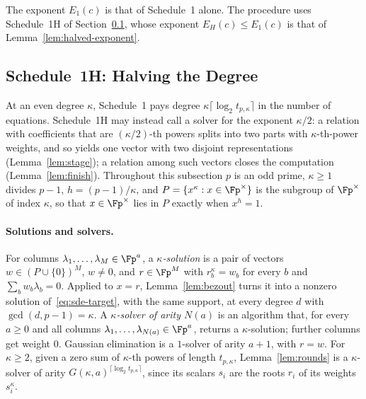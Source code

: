 
The exponent $E_1(c)$ is that of Schedule~1 alone. The procedure uses Schedule~1H of Section~\ref{sec:halving}, whose exponent $E_H(c) \le E_1(c)$ is that of Lemma~\ref{lem:halved-exponent}.

\subsection{Schedule~1H: Halving the Degree}
\label{sec:halving}

At an even degree $\kappa$, Schedule~1 pays degree $\kappa\lceil\log_2 t_{p,\kappa}\rceil$ in the number of equations. Schedule~1H may instead call a solver for the exponent $\kappa/2$: a relation with coefficients that are $(\kappa/2)$-th powers splits into two parts with $\kappa$-th-power weights, and so yields one vector with two disjoint representations (Lemma~\ref{lem:stage}); a relation among such vectors closes the computation (Lemma~\ref{lem:finish}). Throughout this subsection $p$ is an odd prime, $\kappa \ge 1$ divides $p-1$, $h = (p-1)/\kappa$, and $P = \{x^\kappa : x \in \Fp^\times\}$ is the subgroup of $\Fp^\times$ of index $\kappa$, so that $x \in \Fp^\times$ lies in $P$ exactly when $x^h = 1$.

\paragraph{Solutions and solvers.} For columns $\lambda_1,\dots,\lambda_M \in \Fp^a$, a \emph{$\kappa$-solution} is a pair of vectors $w \in (P \cup \{0\})^M$, $w \ne 0$, and $r \in \Fp^M$ with $r_b^\kappa = w_b$ for every $b$ and $\sum_b w_b\lambda_b = 0$. Applied to $x = r$, Lemma~\ref{lem:bezout} turns it into a nonzero solution of~\eqref{eq:sde-target}, with the same support, at every degree $d$ with $\gcd(d,p-1) = \kappa$. A \emph{$\kappa$-solver of arity $N(a)$} is an algorithm that, for every $a \ge 0$ and all columns $\lambda_1,\dots,\lambda_{N(a)} \in \Fp^a$, returns a $\kappa$-solution; further columns get weight $0$. Gaussian elimination is a $1$-solver of arity $a+1$, with $r = w$. For $\kappa \ge 2$, given a zero sum of $\kappa$-th powers of length $t_{p,\kappa}$, Lemma~\ref{lem:rounds} is a $\kappa$-solver of arity $G(\kappa,a)^{\lceil\log_2 t_{p,\kappa}\rceil}$, since its scalars $s_i$ are the roots $r_i$ of its weights $s_i^\kappa$.

